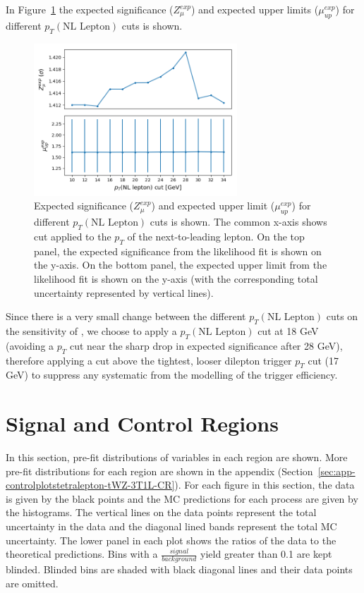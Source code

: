 In Figure~\ref{fig:4lep-NLlep-optimization} the expected significance ($Z_{\mu}^{exp}$) and expected upper limits ($\mu_{up}^{exp}$) for different $p_{T}(\text{NL Lepton})$ cuts is shown.
\begin{figure}[h!]
	\includegraphics[width = 0.68\textwidth]{figures/NL_Lep_optimization.png}
  \centering
	\caption{Expected significance ($Z_{\mu}^{exp}$) and expected upper limit ($\mu_{up}^{exp}$) for different $p_{T}(\text{NL Lepton})$ cuts is shown. The common x-axis shows cut applied to the $p_{T}$ of the next-to-leading lepton. On the top panel, the expected significance from the likelihood fit is shown on the y-axis. On the bottom panel, the expected upper limit from the likelihood fit is shown on the y-axis (with the corresponding total uncertainty represented by vertical lines).}
	\label{fig:4lep-NLlep-optimization}
\end{figure}

Since there is a very small change between the different $p_{T}(\text{NL Lepton})$ cuts on the sensitivity of \tWZ, we choose to apply a $p_{T}(\text{NL Lepton})$ cut at 18 GeV (avoiding a $p_{T}$ cut near the sharp drop in expected significance after 28 GeV), therefore applying a cut above the tightest, looser dilepton trigger $p_{T}$ cut (17 GeV) to suppress any systematic from the modelling of the trigger efficiency.

\section{Signal and Control Regions}

In this section, pre-fit distributions of variables in each region are shown. More pre-fit distributions for each region are shown in the appendix (Section~\ref{sec:app-controlplotstetralepton-tWZ-3T1L-CR}). For each figure in this section, the data is given by the black points and the MC predictions for each process are given by the histograms. The vertical lines on the data points represent the total uncertainty in the data and the diagonal lined bands represent the total MC uncertainty. The lower panel in each plot shows the ratios of the data to the theoretical predictions. Bins with a $\frac{signal}{background}$ yield greater than 0.1 are kept blinded. Blinded bins are shaded with black diagonal lines and their data points are omitted. \\\\

